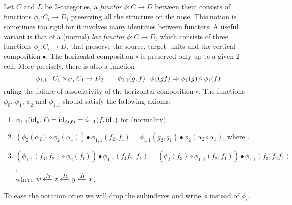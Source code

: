 Let $C$ and $D$ be 2-categories, a \emph{functor} $\phi\colon C\to D$ between them consists of functions $\phi_i\colon C_i\to D_i$  preserving all the structure on the nose.
This notion is sometimes too rigid for it involves many identities between functors.
A useful variant is that of a (normal) \emph{lax functor} $\phi\colon C\to D$, which consists of three functions $\phi_i\colon C_i\to D_i$ that preserve the source, target, units and the vertical composition $\bullet$.
The horizontal composition $\circ$ is preserved only up to a given 2-cell.
More precisely, there is also a function
\[ \phi_{1,1}\colon C_1\times_{C_0}C_1\to D_2 \qquad \phi_{1,1}(g,f)\colon\phi_1(gf)\Rightarrow\phi_1(g)\circ\phi_1(f) \]
ruling the failure of associativity of the horizontal composition $\circ$.
The functions $\phi_0$, $\phi_1$, $\phi_2$ and $\phi_{1,1}$ should satisfy the following axioms:
\begin{enumerate}[label=\roman*)]
  \item $\phi_{1,1}(\operatorname{id}_y,f) = \operatorname{id}_{\phi(f)} = \phi_{1,1}(f,\operatorname{id}_x)$ for  (normality).
  \item $(\phi_2(\alpha_2)\circ \phi_2(\alpha_1))\bullet \phi_{1,1}(f_2,f_1) = \phi_{1,1}(g_2,g_1)\bullet \phi_2(\alpha_2\circ\alpha_1)$, where
  .
  \item $(\phi_{1,1}(f_3,f_2)\circ \phi_2(f_1))\bullet \phi_{1,1}(f_3f_2,f_1) = (\phi_2(f_3)\circ \phi_{1,1}(f_2,f_1))\bullet \phi_{1,1}(f_3,f_2f_1)$, \\
  where $w\xleftarrow{f_3}z\xleftarrow{f_2}y\xleftarrow{f_1}x$.
\end{enumerate}
To ease the notation often we will drop the subindexes and write $\phi$ instead of $\phi_i$.

